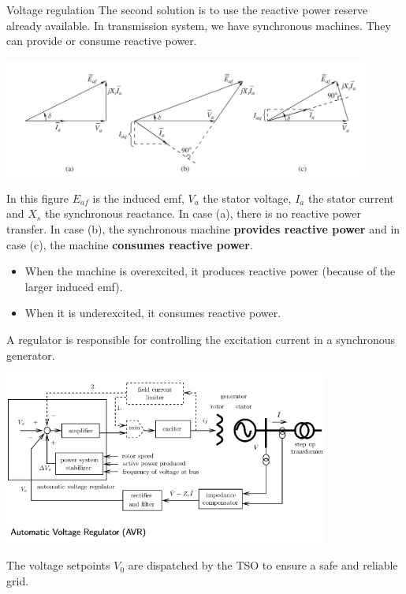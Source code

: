 \begin{frame}[allowframebreaks]{Voltage regulation}
The second solution is to use the reactive power reserve already available.
In transmission system, we have synchronous machines. They can provide or consume reactive power.
\begin{center}
\includegraphics[width=0.9\textwidth]{images/SG_EMF.png}
\end{center}
In this figure $E_{af}$ is the induced emf, $V_a$ the stator voltage, $I_a$ the stator current and $X_s$ the synchronous reactance. In case (a), there is no reactive power transfer. In case (b), the synchronous machine \textbf{provides reactive power} and in case (c), the machine \textbf{consumes reactive power}.


\begin{itemize}
    \item When the machine is overexcited, it produces reactive power (because of the larger induced emf).
    \item When it is underexcited, it consumes reactive power.
\end{itemize}
A regulator is responsible for controlling the excitation current in a synchronous generator.
\begin{center}
\includegraphics[width=0.8\textwidth]{images/AVR.png}
\end{center}
The voltage setpoints $V_0$ are dispatched by the TSO to ensure a safe and reliable grid.
\end{frame}

